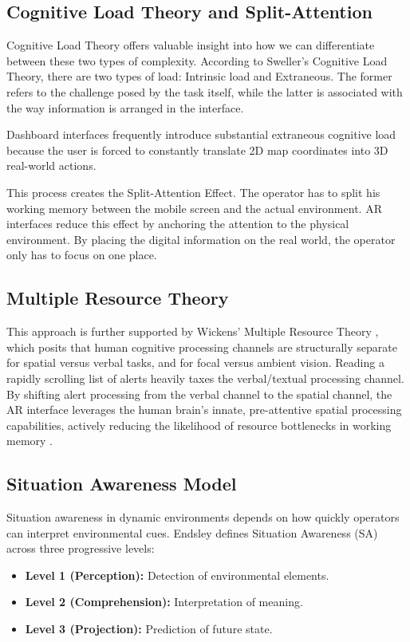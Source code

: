 \documentclass[conference]{IEEEtran}
\begin{document}
\subsection{Cognitive Load Theory and Split-Attention}
Cognitive Load Theory offers valuable insight into how we can differentiate between these two types of complexity. According to Sweller’s Cognitive Load Theory, there are two types of load: Intrinsic load and Extraneous. The former refers to the challenge posed by the task itself, while the latter is associated with the way information is arranged in the interface.

Dashboard interfaces frequently introduce substantial extraneous cognitive load because the user is forced to constantly translate 2D map coordinates into 3D real-world actions. 

This process creates the Split-Attention Effect. The operator has to split his working memory between the mobile screen and the actual environment. AR interfaces reduce this effect by anchoring the attention to the physical environment. By placing the digital information on the real world, the operator only has to focus on one place.

\subsection{Multiple Resource Theory}
This approach is further supported by Wickens' Multiple Resource Theory \cite{b4}, which posits that human cognitive processing channels are structurally separate for spatial versus verbal tasks, and for focal versus ambient vision. Reading a rapidly scrolling list of alerts heavily taxes the verbal/textual processing channel. By shifting alert processing from the verbal channel to the spatial channel, the AR interface leverages the human brain's innate, pre-attentive spatial processing capabilities, actively reducing the likelihood of resource bottlenecks in working memory \cite{b4}.

\subsection{Situation Awareness Model}
Situation awareness in dynamic environments depends on how quickly operators can interpret environmental cues. Endsley \cite{b5} defines Situation Awareness (SA) across three progressive levels:
\begin{itemize}
    \item \textbf{Level 1 (Perception):} Detection of environmental elements.
    \item \textbf{Level 2 (Comprehension):} Interpretation of meaning.
    \item \textbf{Level 3 (Projection):} Prediction of future state.
\end{itemize}
\end{document}
